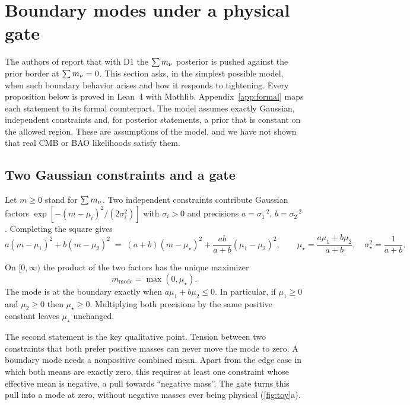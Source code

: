 \section{Boundary modes under a physical gate}
\label{sec:boundary-mode}

The authors of \cite{arxiv2601_16277} report that with D1 the $\sum m_\nu$ posterior is pushed against the prior border at $\sum m_\nu=0$. This section asks, in the simplest possible model, when such boundary behavior arises and how it responds to tightening. Every proposition below is proved in Lean~4 with Mathlib. Appendix~\ref{app:formal} maps each statement to its formal counterpart. The model assumes exactly Gaussian, independent constraints and, for posterior statements, a prior that is constant on the allowed region. These are assumptions of the model, and we have not shown that real CMB or BAO likelihoods satisfy them.

\subsection{Two Gaussian constraints and a gate}
Let $m\ge0$ stand for $\sum m_\nu$. Two independent constraints contribute Gaussian factors $\exp[-(m-\mu_i)^2/(2\sigma_i^2)]$ with $\sigma_i>0$ and precisions $a=\sigma_1^{-2}$, $b=\sigma_2^{-2}$. Completing the square gives
\begin{equation}
  a(m-\mu_1)^2+b(m-\mu_2)^2 \;=\; (a+b)(m-\mu_\star)^2+\frac{ab}{a+b}(\mu_1-\mu_2)^2,
  \qquad
  \mu_\star=\frac{a\mu_1+b\mu_2}{a+b},\quad \sigma_\star^2=\frac{1}{a+b}.
  \label{eq:toy_combined_gaussian}
\end{equation}

\begin{proposition}\label{prop:mode}
On $[0,\infty)$ the product of the two factors has the unique maximizer
\begin{equation}
  m_{\mathrm{mode}}=\max(0,\mu_\star).
  \label{eq:toy_trunc_mode}
\end{equation}
The mode is at the boundary exactly when $a\mu_1+b\mu_2\le0$. In particular, if $\mu_1\ge0$ and $\mu_2\ge0$ then $\mu_\star\ge0$. Multiplying both precisions by the same positive constant leaves $\mu_\star$ unchanged.
\end{proposition}

The second statement is the key qualitative point. Tension between two constraints that both prefer positive masses can never move the mode to zero. A boundary mode needs a nonpositive combined mean. Apart from the edge case in which both means are exactly zero, this requires at least one constraint whose effective mean is negative, a pull towards ``negative mass''. The gate turns this pull into a mode at zero, without negative masses ever being physical (\cref{fig:toy}a).

